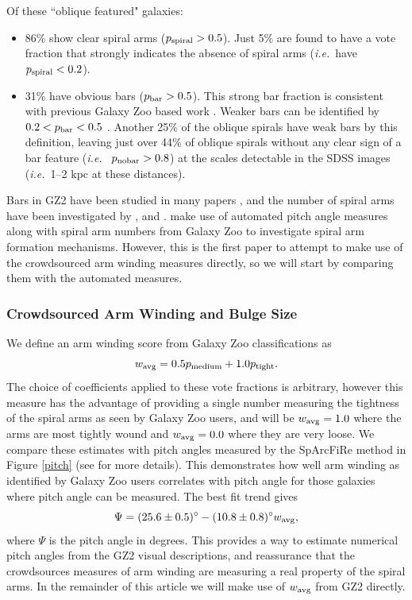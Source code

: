 \documentclass[usenatbib]{mn2e}
\newcommand{\ie}{{\it i.e.}}
\newcommand{\be}{\begin{equation}}
\newcommand{\ee}{\end{equation}}
\begin{document}
 Of these ``oblique featured" galaxies: 
\begin{itemize}
\item {86}\% show clear spiral arms ($p_{\rm spiral} > 0.5$). Just {5\%} are found to have a vote fraction that strongly indicates the absence of spiral arms (\ie ~have $p_{\rm spiral}<0.2$). 
\item {31}\% have obvious bars ($p_{\rm bar}>0.5$). This strong bar fraction is consistent with previous Galaxy Zoo based work \citep[e.g.][]{Masters2011, Masters2012}. Weaker bars can be identified by $0.2<p_{\rm bar}<0.5$ \citep[e.g.][]{Skibba2012,Willett2013,Kruk2018}. Another {25}\% of the oblique spirals have weak bars by this definition, leaving just over {44\%} of oblique spirals without any clear sign of a bar feature (\ie~ $p_{\rm no bar}>0.8$) at the scales detectable in the SDSS images (\ie ~1--2 kpc at these distances). 
\end{itemize}

Bars in GZ2 have been studied in many papers \citep[e.g.][]{Masters2011, Masters2012, Skibba2012, Cheung2013, Cheung2015, Galloway2015, Kruk2017, Kruk2018}, and the number of spiral arms have been investigated by \citet{Willett2015}, \citet{Hart2016} and \citet{Hart2017a}. \citet{Hart2017b,Hart2018} make use of automated pitch angle measures along with spiral arm numbers from Galaxy Zoo to investigate spiral arm formation mechanisms. However, this is the first paper to attempt to make use of the crowdsourced arm winding measures directly, so we will start by comparing them with the automated measures. 

\subsubsection{Crowdsourced Arm Winding and Bulge Size}

We define an arm winding score from Galaxy Zoo classifications as
\be
\label{eqn:winding}
w_{\rm avg} =  0.5p_{\rm medium} + 1.0p_{\rm tight}.
\ee
The choice of coefficients applied to these vote fractions is arbitrary, however this measure has the advantage of providing a single number measuring the tightness of the spiral arms as seen by Galaxy Zoo users, and will be $w_{\rm avg} = 1.0$ where the arms are most tightly wound and $w_{\rm avg} = 0.0$ where they are very loose. We compare these estimates with pitch angles measured by the SpArcFiRe method \citep{DavisHayes2014} in Figure \ref{pitch} (see \citealt{Hart2017b} for more details). This demonstrates how well arm winding as identified by Galaxy Zoo users correlates with pitch angle for those galaxies where pitch angle can be measured. The best fit trend gives 
\be
\label{eqn:pitch}
\Psi =  (25.6\pm0.5)^\circ - (10.8\pm0.8)^\circ w_{\rm avg}, 
\ee
where $\Psi$ is the pitch angle in degrees. This provides a way to estimate numerical pitch angles from the GZ2 visual descriptions, and reassurance that the crowdsources measures of arm winding are measuring a real property of the spiral arms. In the remainder of this article we will make use of $w_{\rm avg}$ from GZ2 directly.  
\end{document}
